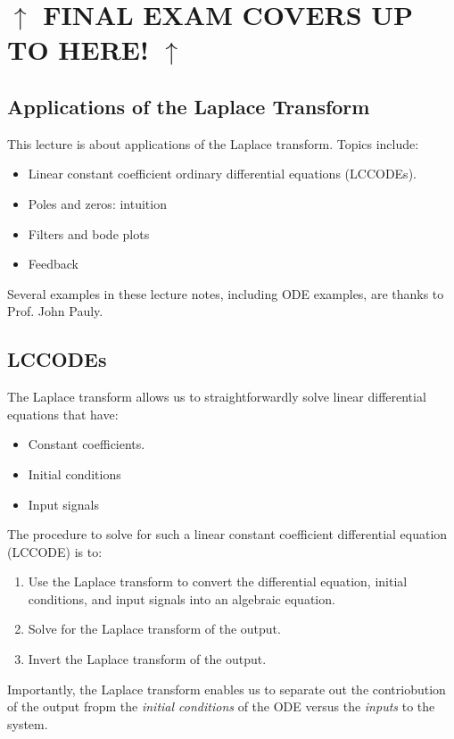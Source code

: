 \documentclass[10pt]{article}
\begin{document}
\section*{$\uparrow$ FINAL EXAM COVERS UP TO HERE! $\uparrow$}
\subsection*{Applications of the Laplace Transform}
This lecture is about applications of the Laplace transform.  Topics include:
\begin{itemize}
    \item Linear constant coefficient ordinary differential equations (LCCODEs).
    \item Poles and zeros: intuition
    \item Filters and bode plots
    \item Feedback
\end{itemize}
Several examples in these lecture notes, including ODE examples, are thanks to Prof. John Pauly.
\subsection*{LCCODEs}
The Laplace transform allows us to straightforwardly solve linear differential equations that have:
\begin{itemize}
    \item Constant coefficients.
    \item Initial conditions
    \item Input signals
\end{itemize}
The procedure to solve for such a linear constant coefficient differential equation (LCCODE) is to:
\begin{enumerate}
    \item Use the Laplace transform to convert the differential equation, initial conditions, and input signals into an algebraic equation.
    \item Solve for the Laplace transform of the output.
    \item Invert the Laplace transform of the output.
\end{enumerate}
Importantly, the Laplace transform enables us to separate out the contriobution of the output fropm the \textit{initial conditions} of the ODE versus the \textit{inputs} to the system.
\end{document}
